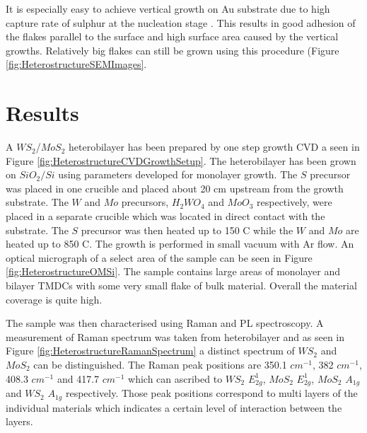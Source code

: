 It is especially easy to achieve vertical growth on Au substrate due to high capture rate of sulphur at the nucleation stage \cite{Gao2015}. This results in good adhesion of the flakes parallel to the surface and high surface area caused by the vertical growths. Relatively big flakes can still be grown using this procedure (Figure \ref{fig:HeterostructureSEMImages}.

\section{Results}

A $WS_2$/$MoS_2$ heterobilayer has been prepared by one step growth CVD a seen in Figure \ref{fig:HeterostructureCVDGrowthSetup}. The heterobilayer has been grown on $SiO_2/Si$ using parameters developed for monolayer growth. The $S$ precursor was placed in one crucible and placed about 20 cm upstream from the growth substrate. The $W$ and $Mo$ precursors, $H_2WO_4$ and $MoO_3$ respectively, were placed in a separate crucible which was located in direct contact with the substrate. The $S$ precursor was then heated up to 150 {\degree}C while the $W$ and $Mo$ are heated up to 850 {\degree}C. The growth is performed in small vacuum with Ar flow. An optical micrograph of a select area of the sample can be seen in Figure \ref{fig:HeterostructureOMSi}. The sample contains large areas of monolayer and bilayer TMDCs with some very small flake of bulk material. Overall the material coverage is quite high.

The sample was then characterised using Raman and PL spectroscopy. A measurement of Raman spectrum was taken from heterobilayer and as seen in Figure \ref{fig:HeterostructureRamanSpectrum} a distinct spectrum of $WS_2$ and $MoS_2$ can be distinguished. The Raman peak positions are 350.1 $cm^{-1}$, 382 $cm^{-1}$, 408.3 $cm^{-1}$ and 417.7 $cm^{-1}$ which can ascribed to $WS_2$ $E^1_{2g}$, $MoS_2$ $E^1_{2g}$, $MoS_2$ $A_{1g}$ and $WS_2$ $A_{1g}$ respectively. Those peak positions correspond to multi layers of the individual materials which indicates a certain level of interaction between the layers.

